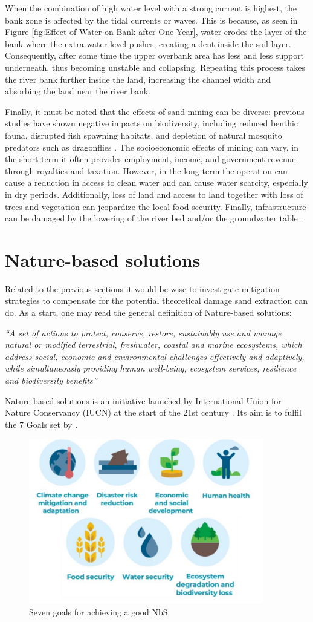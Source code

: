 When the combination of high water level with a strong current is highest, the bank zone is affected by the tidal currents or waves. This is because, as seen in Figure \ref{fig:Effect of Water on Bank after One Year}, water erodes the layer of the bank where the extra water level pushes, creating a dent inside the soil layer.
Consequently, after some time the upper overbank area has less and less support underneath, thus becoming unstable and collapsing. 
Repeating this process takes the river bank further inside the land, increasing the channel width and absorbing the land near the river bank. 

Finally, it must be noted that the effects of sand mining can be diverse: previous studies have shown negative impacts on biodiversity, including reduced benthic fauna, disrupted fish spawning habitats, and depletion of natural mosquito predators such as dragonflies \autocite{sand-mining-boek}. The socioeconomic effects of mining can vary, in the short-term it often provides employment, income, and government revenue through royalties and taxation. However, in the long-term the operation can cause a reduction in access to clean water and can cause water scarcity, especially in dry periods. Additionally, loss of land and access to land together with loss of trees and vegetation can jeopardize the local food security. Finally, infrastructure can be damaged by the lowering of the river bed and/or the groundwater table \autocite{sand-mining-boek}.

\section{Nature-based solutions}
Related to the previous sections it would be wise to investigate mitigation strategies to compensate for the potential theoretical damage sand extraction can do. As a start, one may read the general definition of Nature-based solutions:

\textit{“A set of actions to protect, conserve, restore, sustainably
use and manage natural or modified terrestrial, freshwater, coastal and marine
ecosystems, which address social, economic and environmental challenges
effectively and adaptively, while simultaneously providing human well-being,
ecosystem services, resilience and biodiversity benefits” \autocite{eiselinVerenigdeNatiesStemmen2022}}

Nature-based solutions is an initiative launched by International Union for Nature Conservancy (IUCN) at the start of the 21st century \autocite{nature based cassin jan}. Its aim is to fulfil the 7 Goals set by \autocite{dunlopEvolutionFutureResearch2024}.

\begin{figure}[H]
    \centering
    \includegraphics[width=0.50\linewidth]{figures/ThesevenNBSgoals.png}
    \caption{Seven goals for achieving a good NbS \autocite{dunlopEvolutionFutureResearch2024}}
    \label{fig:7g}
\end{figure}
